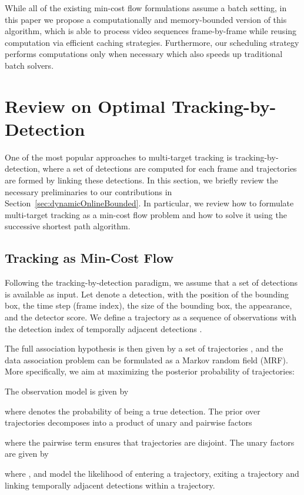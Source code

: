\documentclass[10pt,twocolumn,letterpaper]{article}
\newcommand{\secref}[1]{Section~\ref{#1}}
\begin{document}
While all of the existing min-cost flow formulations assume a batch setting, in this paper we propose a computationally and memory-bounded version of this algorithm, which is able to process video sequences frame-by-frame while reusing computation via efficient caching strategies. Furthermore, our scheduling strategy performs computations only when necessary which also speeds up traditional batch solvers. \section{Review on Optimal Tracking-by-Detection} \label{sec:review}

One of the most popular approaches to multi-target tracking is tracking-by-detection, where a set of detections are computed for each frame and trajectories are formed by linking these detections. 
In this section, we briefly review the necessary preliminaries to our contributions in \secref{sec:dynamicOnlineBounded}. In particular, we review how to formulate multi-target tracking as a min-cost flow problem and how to solve it using the successive shortest path algorithm.


\subsection{Tracking as Min-Cost Flow}

Following the tracking-by-detection paradigm, we assume that a set of detections  is available as input. 
Let  denote a detection, with  the position of the bounding box,  the time step (frame index),  the size of the bounding box,  the appearance, and  the detector score. 
We define a trajectory as a sequence of observations  with  the detection index of  temporally adjacent detections .  

The full association hypothesis is then given by a set of trajectories , and the 
 data association problem can be formulated as a Markov random field (MRF). More specifically, we aim at maximizing the posterior probability of trajectories:

The observation model is given by

where  denotes the probability of  being a true detection. The prior over trajectories decomposes into a product of unary and pairwise factors

where the pairwise term ensures that trajectories are disjoint. The unary factors are given by

where ,  and   model the likelihood of entering a trajectory, exiting a trajectory and linking  temporally adjacent  detections within a trajectory.
\end{document}
